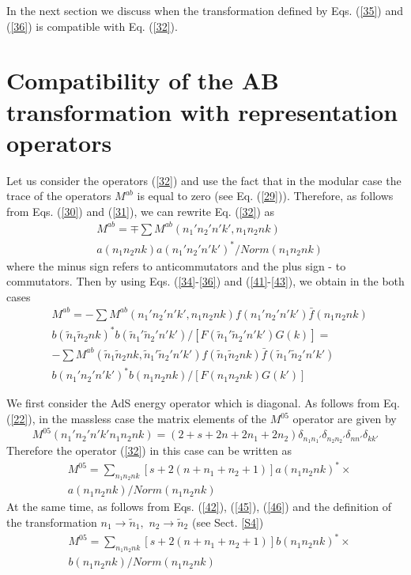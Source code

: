 \documentclass[a4paper,12pt]{article}%
\begin{document}
In the next section we discuss when the transformation
defined by Eqs. (\ref{35}) and (\ref{36}) is compatible
with Eq. (\ref{32}). 

\section{Compatibility of the AB transformation with
representation operators}
\label{S5}

Let us consider the operators (\ref{32}) and
use the fact that in the modular case the trace of the
operators $M^{ab}$ is equal to zero (see Eq. (\ref{29})).   
Therefore, as follows from Eqs. (\ref{30}) and (\ref{31}), 
we can rewrite Eq. (\ref{32}) as
\begin{eqnarray}  
&M^{ab}=\mp \sum
M^{ab}(n_1'n_2'n'k',n_1n_2nk)\nonumber\\
&a(n_1n_2nk)a(n_1'n_2'n'k')^*/Norm(n_1n_2nk)
\label{44}
\end{eqnarray}
where the minus sign refers to anticommutators and the plus sign -
to commutators. Then by using Eqs. (\ref{34}-\ref{36}) and 
(\ref{41}-\ref{43}), we obtain in the both cases
\begin{eqnarray}  
&M^{ab}=-\sum
M^{ab}(n_1'n_2'n'k',n_1n_2nk)
f(n_1'n_2'n'k'){\bar f}(n_1n_2nk)\nonumber\\
&b({\tilde n}_1{\tilde n}_2nk)^*
b({\tilde n}_1'{\tilde n}_2'n'k')/
[F({\tilde n}_1'{\tilde n}_2'n'k')G(k)]=\nonumber\\
&-\sum M^{ab}({\tilde n}_1{\tilde n}_2nk,
{\tilde n}_1'{\tilde n}_2'n'k')
f({\tilde n}_1{\tilde n}_2nk)
{\bar f}({\tilde n}_1'{\tilde n}_2'n'k')\nonumber\\
&b(n_1'n_2'n'k')^*b(n_1n_2nk)/[F(n_1n_2nk)G(k')]
\label{45}
\end{eqnarray}

We first consider the AdS energy operator which is diagonal.
As follows from Eq. (\ref{22}), in the massless case the 
matrix elements of the $M^{05}$ operator are given by
\begin{equation}
M^{05}(n_1'n_2'n'k'n_1n_2nk)=
(2+s+2n+2n_1+2n_2)\delta_{n_1n_1'}
\delta_{n_2n_2'}\delta_{nn'}\delta_{kk'}
\label{46}
\end{equation}
Therefore the operator (\ref{32}) in this case can be written
as
\begin{eqnarray}  
&M^{05}=\sum_{n_1n_2nk}
[s + 2(n+n_1+n_2+1)]a(n_1n_2nk)^*\times\nonumber\\
&a(n_1n_2nk)/Norm(n_1n_2nk)
\label{47}
\end{eqnarray}
At the same time, as follows from Eqs. (\ref{42}), (\ref{45}), 
(\ref{46}) and the definition of the transformation 
$n_1\rightarrow {\tilde n}_1,\,\,n_2\rightarrow {\tilde n}_2$ 
(see Sect. \ref{S4})
\begin{eqnarray}  
&M^{05}=\sum_{n_1n_2nk}
[s + 2(n+n_1+n_2+1)]b(n_1n_2nk)^*\times\nonumber\\
&b(n_1n_2nk)/Norm(n_1n_2nk)
\label{48}
\end{eqnarray}
\end{document}

